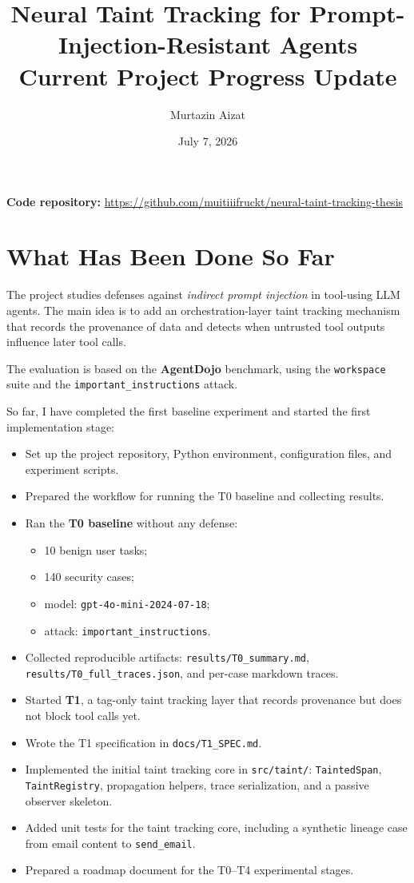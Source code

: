 \documentclass[11pt,a4paper]{article}
\title{Neural Taint Tracking for Prompt-Injection-Resistant Agents\\[0.5em]\large Current Project Progress Update}
\author{Murtazin Aizat}
\date{July 7, 2026}
\begin{document}
\maketitle

\noindent\textbf{Code repository:} \url{https://github.com/muitiiifruckt/neural-taint-tracking-thesis}

\section{What Has Been Done So Far}

The project studies defenses against \emph{indirect prompt injection} in tool-using LLM agents. The main idea is to add an orchestration-layer taint tracking mechanism that records the provenance of data and detects when untrusted tool outputs influence later tool calls.

The evaluation is based on the \textbf{AgentDojo} benchmark, using the \texttt{workspace} suite and the \texttt{important\_instructions} attack.

So far, I have completed the first baseline experiment and started the first implementation stage:

\begin{itemize}
  \item Set up the project repository, Python environment, configuration files, and experiment scripts.
  \item Prepared the workflow for running the T0 baseline and collecting results.
  \item Ran the \textbf{T0 baseline} without any defense:
    \begin{itemize}
      \item 10 benign user tasks;
      \item 140 security cases;
      \item model: \texttt{gpt-4o-mini-2024-07-18};
      \item attack: \texttt{important\_instructions}.
    \end{itemize}
  \item Collected reproducible artifacts: \texttt{results/T0\_summary.md}, \texttt{results/T0\_full\_traces.json}, and per-case markdown traces.
  \item Started \textbf{T1}, a tag-only taint tracking layer that records provenance but does not block tool calls yet.
  \item Wrote the T1 specification in \texttt{docs/T1\_SPEC.md}.
  \item Implemented the initial taint tracking core in \texttt{src/taint/}: \texttt{TaintedSpan}, \texttt{TaintRegistry}, propagation helpers, trace serialization, and a passive observer skeleton.
  \item Added unit tests for the taint tracking core, including a synthetic lineage case from email content to \texttt{send\_email}.
  \item Prepared a roadmap document for the T0--T4 experimental stages.
\end{itemize}
\end{document}
